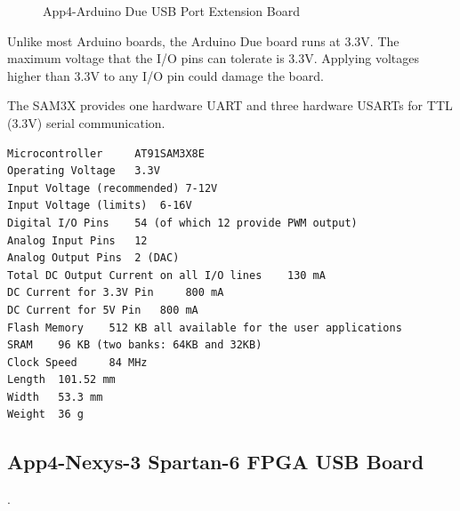 \begin{figure}[htbp]
	\begin{center}
		\caption{App4-Arduino Due USB Port Extension Board}
		\label{fig:App4-Captured-Arduino-Due-USB-Extension-Board.jpg}
	\end{center}
\end{figure}

Unlike most Arduino boards, the Arduino Due board runs at 3.3V. The maximum voltage that the I/O pins can tolerate is 3.3V. Applying voltages higher than 3.3V to any I/O pin could damage the board. 
\vspace*{1\baselineskip}

The SAM3X provides one hardware UART and three hardware USARTs for TTL (3.3V) serial communication.

\lstset{basicstyle=\ttfamily\small}
\begin{lstlisting}[breaklines, frame=single, caption={App4-Specifications of Arduino Due USB Interface Board}, label=App4-Specifications-Arduino-Due-USB-Interface-Board]
Microcontroller 	AT91SAM3X8E
Operating Voltage 	3.3V
Input Voltage (recommended) 7-12V
Input Voltage (limits) 	6-16V
Digital I/O Pins 	54 (of which 12 provide PWM output)
Analog Input Pins 	12
Analog Output Pins 	2 (DAC)
Total DC Output Current on all I/O lines 	130 mA
DC Current for 3.3V Pin 	800 mA
DC Current for 5V Pin 	800 mA
Flash Memory 	512 KB all available for the user applications
SRAM 	96 KB (two banks: 64KB and 32KB)
Clock Speed 	84 MHz
Length 	101.52 mm
Width 	53.3 mm
Weight 	36 g
\end{lstlisting}

\clearpage
\pagebreak
		
\subsection{App4-Nexys-3 Spartan-6 FPGA USB Board}. 


